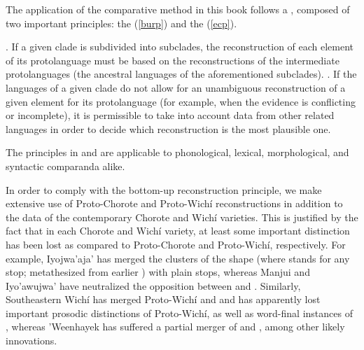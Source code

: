 The application of the comparative method in this book follows a , composed of two important principles: the  (\ref{burp}) and the  (\ref{ecp}).

\begin{exe}
    \ex {}. If a given clade is subdivided into subclades, the reconstruction of each element of its protolanguage must be based on the reconstructions of the intermediate protolanguages (the ancestral languages of the aforementioned subclades).\label{burp}
    \ex {}. If the languages of a given clade do not allow for an unambiguous reconstruction of a given element for its protolanguage (for example, when the evidence is conflicting or incomplete), it is permissible to take into account data from other related languages in order to decide which reconstruction is the most plausible one.\label{ecp}
\end{exe}

The principles in  and  are applicable to phonological, lexical, morphological, and syntactic comparanda alike.

In order to comply with the bottom-up reconstruction principle, we make extensive use of Proto-Chorote and Proto-Wichí reconstructions in addition to the data of the contemporary Chorote and Wichí varieties. This is justified by the fact that in each Chorote and Wichí variety, at least some important distinction has been lost as compared to Proto-Chorote and Proto-Wichí, respectively. For example, Iyojwa’aja’ has merged the clusters of the shape  (where  stands for any stop; metathesized from earlier ) with plain stops, whereas Manjui and Iyo’awujwa’ have neutralized the opposition between  and . Similarly, Southeastern Wichí has merged Proto-Wichí  and  and has apparently lost important prosodic distinctions of Proto-Wichí, as well as word-final instances of , whereas ’Weenhayek has suffered a partial merger of  and , among other likely innovations.


